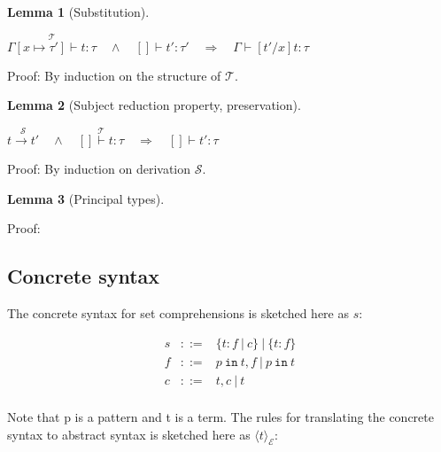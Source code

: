 \documentclass[a4paper]{article}
\newcommand{\pipe}{\ | \ }
\newcommand{\s}[1]{\mathtt{#1}}
\newcommand{\im}{\Rightarrow}
\newcommand{\step}{\to}
\newcommand{\T}{\mathcal{T}}
\renewcommand{\S}{\mathcal{S}}
\newcommand{\stackover}[2]{\stackrel{{#2}}{#1}}
\newcommand{\sugar}[2]{\langle#2\rangle_{\mathcal{#1}}}
\newcommand{\sug}[1]{\sugar{E}{#1}}
\newtheorem{lemma}{Lemma}[section]
\begin{document}
\begin{lemma}[Substitution] $ $
  \label{lemma:substitution}

$\stackover{\Gamma[x \mapsto \tau'] \vdash t: \tau}{\T} \quad \land \quad []\vdash t':\tau' \quad \im \quad
\Gamma \vdash [t'/x]t : \tau$
\end{lemma}

Proof: By induction on the structure of $\T$.


\begin{lemma}[Subject reduction property, preservation] $ $
  \label{lemma:preservation}

$\stackover{t \step t'}{\S} \quad \land \quad \stackover{[] \vdash t: \tau}{\T} \quad \im \quad [] \vdash t' : \tau$
\end{lemma}

Proof: By induction on derivation $\S$.


\begin{lemma}[Principal types] $ $
  \label{lemma:principalTypes}
  
\end{lemma}

Proof:

\subsection{Concrete syntax}

The concrete syntax for set comprehensions is sketched here as $s$:

\begin{eqnarray*}
s & ::= & \{ t : f \pipe c\} \pipe \{ t : f \}\\
f & ::= & p \s{\ in\ } t, f \pipe p \s{\ in\ } t\\
c & ::= & t, c \pipe t \\
\end{eqnarray*}

Note that p is a pattern and t is a term. The rules for translating
the concrete syntax to abstract syntax is sketched here as
$\sug{t}$:
\end{document}
